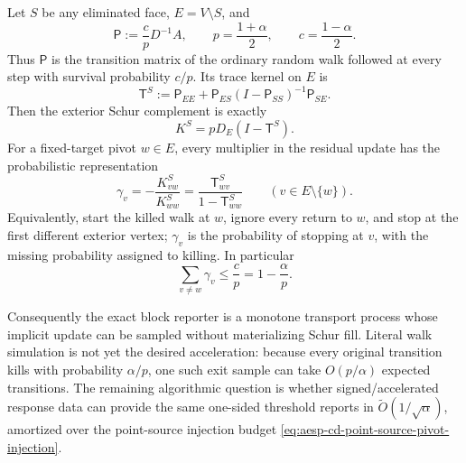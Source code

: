 \begin{proposition}
\label{prop:aesp-cd-point-source-harmonic-exit}
Let $S$ be any eliminated face, $E=V\setminus S$, and
\begin{equation*}
 \mathsf P:=\frac{c}{p}D^{-1}A,
 \qquad
 p=\frac{1+\alpha}{2},
 \qquad c=\frac{1-\alpha}{2}.
\end{equation*}
Thus \(\mathsf P\) is the transition matrix of the ordinary random walk
followed at every step with survival probability $c/p$.  Its trace kernel
on $E$ is
\begin{equation}
 \mathsf T^S
 :=\mathsf P_{EE}
   +\mathsf P_{ES}(I-\mathsf P_{SS})^{-1}\mathsf P_{SE}.
 \label{eq:aesp-cd-point-source-trace-kernel}
\end{equation}
Then the exterior Schur complement is exactly
\begin{equation}
 K^S=pD_E(I-\mathsf T^S).
 \label{eq:aesp-cd-point-source-trace-schur}
\end{equation}
For a fixed-target pivot $w\in E$, every multiplier in the residual update
has the probabilistic representation
\begin{equation}
 \gamma_v=-\frac{K^S_{vw}}{K^S_{ww}}
 =\frac{\mathsf T^S_{wv}}{1-\mathsf T^S_{ww}}
 \qquad(v\in E\setminus\{w\}).
 \label{eq:aesp-cd-point-source-harmonic-exit}
\end{equation}
Equivalently, start the killed walk at $w$, ignore every return to $w$,
and stop at the first different exterior vertex; \(\gamma_v\) is the
probability of stopping at $v$, with the missing probability assigned to
killing.  In particular
\begin{equation*}
 \sum_{v\ne w}\gamma_v\leq\frac{c}{p}
 =1-\frac{\alpha}{p}.
\end{equation*}

Consequently the exact block reporter is a monotone transport process whose
implicit update can be sampled without materializing Schur fill.  Literal
walk simulation is not yet the desired acceleration: because every original
transition kills with probability \(\alpha/p\), one such exit sample can
take $O(p/\alpha)$ expected transitions.  The remaining algorithmic
question is whether signed/accelerated response data can provide the same
one-sided threshold reports in \(\widetilde O(1/\sqrt\alpha)\), amortized
over the point-source injection budget
\cref{eq:aesp-cd-point-source-pivot-injection}.
\end{proposition}

